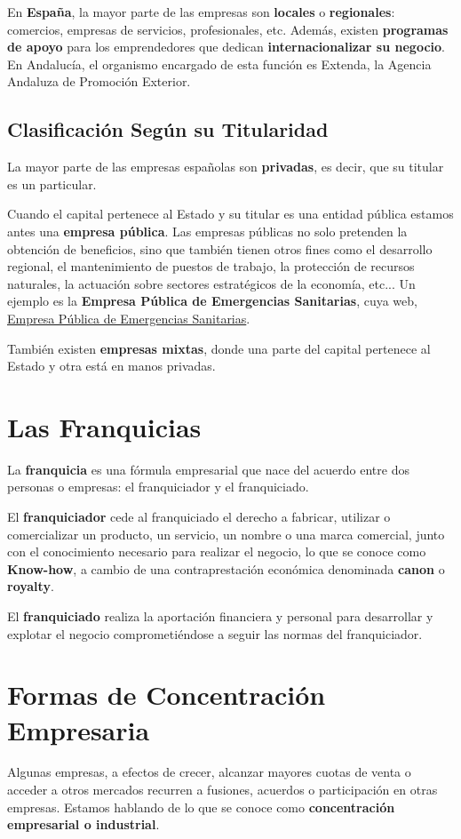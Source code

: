 En \textbf{España},  la mayor parte de las empresas son \textbf{locales} o \textbf{regionales}: comercios, empresas de servicios, profesionales, etc. Además, existen \textbf{programas de apoyo} para los emprendedores que dedican \textbf{internacionalizar su negocio}. En Andalucía, el organismo encargado de esta función es Extenda, la Agencia Andaluza de Promoción Exterior.

\subsection{Clasificación Según su Titularidad}
La mayor parte de las empresas españolas son \textbf{privadas}, es decir, que su titular es un particular.

Cuando el capital pertenece al Estado y su titular es una entidad pública estamos antes una \textbf{empresa pública}. Las empresas públicas no solo pretenden la obtención de beneficios, sino que también tienen otros fines como el desarrollo regional, el mantenimiento de puestos de trabajo, la protección de recursos naturales, la actuación sobre sectores estratégicos de la economía, etc... Un ejemplo es la \textbf{Empresa Pública de Emergencias Sanitarias}, cuya web, \href{http://www.epes.es/}{Empresa Pública de Emergencias Sanitarias}.

También existen \textbf{empresas mixtas}, donde una parte del capital pertenece al Estado y otra está en manos privadas.

\section{Las Franquicias}
La \textbf{franquicia} es una fórmula empresarial que nace del acuerdo entre dos personas o empresas: el franquiciador y  el franquiciado.

El \textbf{franquiciador} cede al franquiciado el derecho a fabricar, utilizar o comercializar un producto, un servicio, un nombre o una marca comercial, junto con el conocimiento necesario para realizar el negocio, lo que se conoce como \textbf{Know-how}, a cambio de una contraprestación económica denominada \textbf{canon} o \textbf{royalty}.

El \textbf{franquiciado} realiza la aportación financiera y personal para desarrollar y explotar el negocio comprometiéndose a seguir las normas del franquiciador.

\section{Formas de Concentración Empresaria}
Algunas empresas, a efectos de crecer, alcanzar mayores cuotas de venta o acceder a otros mercados recurren a fusiones, acuerdos o participación en otras empresas. Estamos hablando de lo que se conoce como \textbf{concentración empresarial o industrial}.

